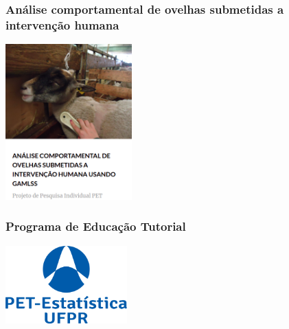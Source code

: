\documentclass[10pt,
  aspectratio=169,
  serif,
  mathserif,
  professionalfont,
  compress,
  handout,
  ]{beamer}\usepackage[]{graphicx}\usepackage[]{color}
\begin{document}
\begin{frame}

\frametitle{Análise comportamental de ovelhas submetidas a intervenção humana}

\begin{center}
  \includegraphics[height=6cm]{img/gamlss.png}
\end{center}

\end{frame}


\begin{frame}

\frametitle{Programa de Educação Tutorial}

\begin{center}
  \includegraphics[height=3cm]{img/pet.png}
\end{center}

\end{frame}

\end{document}
